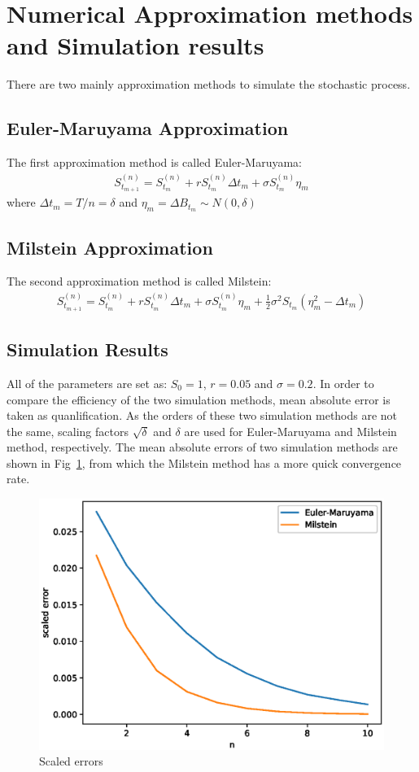 \documentclass{article} %
\begin{document}
\section{Numerical Approximation methods and Simulation results}
There are two mainly approximation methods to simulate the stochastic process.
\subsection{Euler-Maruyama Approximation}
The first approximation method is called Euler-Maruyama:
\begin{align}
  S_{t_{m+1}}^{(n)}=S_{t_{m}}^{(n)}+rS_{t_{m}}^{(n)}\Delta t_{m}+\sigma S_{t_{m}}^{(n)}\eta_{m}
\end{align}
where $\Delta t_{m}=T/n=\delta$ and $\eta_{m}=\Delta B_{t_{m}}\sim N(0,\delta)$

\subsection{Milstein Approximation}
The second approximation method is called Milstein:
\begin{align}
  S_{t_{m+1}}^{(n)}=S_{t_{m}}^{(n)}+rS_{t_{m}}^{(n)}\Delta t_{m}+\sigma S_{t_{m}}^{(n)}\eta_{m}+\frac{1}{2}\sigma^{2}S_{t_{m}}(\eta_{m}^{2}-\Delta t_{m})
\end{align}

\subsection{Simulation Results}
All of the parameters are set as: $S_{0}=1$, $r=0.05$ and $\sigma=0.2$. In order to compare the efficiency of the two simulation methods, mean absolute error is taken as quanlification. As the orders of these two simulation methods are not the same, scaling factors $\sqrt{\delta}$ and $\delta$ are used for Euler-Maruyama and Milstein method, respectively.  The mean absolute errors of two simulation methods are shown in Fig~\ref{fig:1}, from which the Milstein method has a more quick convergence rate.
\begin{figure}[htbp!]
  \centering
  \includegraphics[width=\textwidth]{mc.eps}
  \caption{Scaled errors}
  \label{fig:1}
\end{figure}
\end{document}
